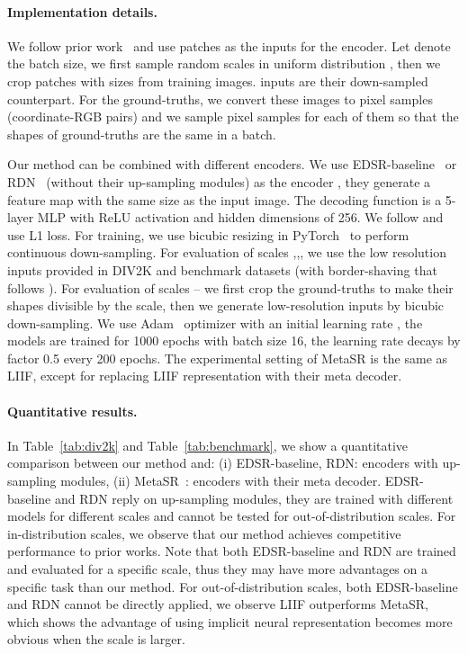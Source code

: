 \documentclass[final]{cvpr}
\begin{document}
\vspace{-1em}
\paragraph{Implementation details.} We follow prior work~\cite{lim2017enhanced} and use  patches as the inputs for the encoder. Let  denote the batch size, we first sample  random scales  in uniform distribution , then we crop  patches with sizes  from training images.  inputs are their down-sampled counterpart. For the ground-truths, we convert these images to pixel samples (coordinate-RGB pairs) and we sample  pixel samples for each of them so that the shapes of ground-truths are the same in a batch.

Our method can be combined with different encoders. We use EDSR-baseline~\cite{lim2017enhanced} or RDN~\cite{zhang2018residual} (without their up-sampling modules) as the encoder , they generate a feature map with the same size as the input image. The decoding function  is a 5-layer MLP with ReLU activation and hidden dimensions of 256. We follow \cite{lim2017enhanced} and use L1 loss. For training, we use bicubic resizing in PyTorch~\cite{NEURIPS2019_9015} to perform continuous down-sampling. For evaluation of scales ,,, we use the low resolution inputs provided in DIV2K and benchmark datasets (with border-shaving that follows \cite{lim2017enhanced}). For evaluation of scales -- we first crop the ground-truths to make their shapes divisible by the scale, then we generate low-resolution inputs by bicubic down-sampling. We use Adam~\cite{kingma2014adam} optimizer with an initial learning rate , the models are trained for 1000 epochs with batch size 16, the learning rate decays by factor 0.5 every 200 epochs. The experimental setting of MetaSR is the same as LIIF, except for replacing LIIF representation with their meta decoder.

\vspace{-1em}
\paragraph{Quantitative results.} In Table~\ref{tab:div2k} and Table~\ref{tab:benchmark}, we show a quantitative comparison between our method and: (i) EDSR-baseline, RDN: encoders with up-sampling modules, (ii) MetaSR~\cite{hu2019meta}: encoders with their meta decoder. EDSR-baseline and RDN reply on up-sampling modules, they are trained with different models for different scales and cannot be tested for out-of-distribution scales. For in-distribution scales, we observe that our method achieves competitive performance to prior works. Note that both EDSR-baseline and RDN are trained and evaluated for a specific scale, thus they may have more advantages on a specific task than our method. For out-of-distribution scales, both EDSR-baseline and RDN cannot be directly applied, we observe LIIF outperforms MetaSR, which shows the advantage of using implicit neural representation becomes more obvious when the scale is larger.
\end{document}
